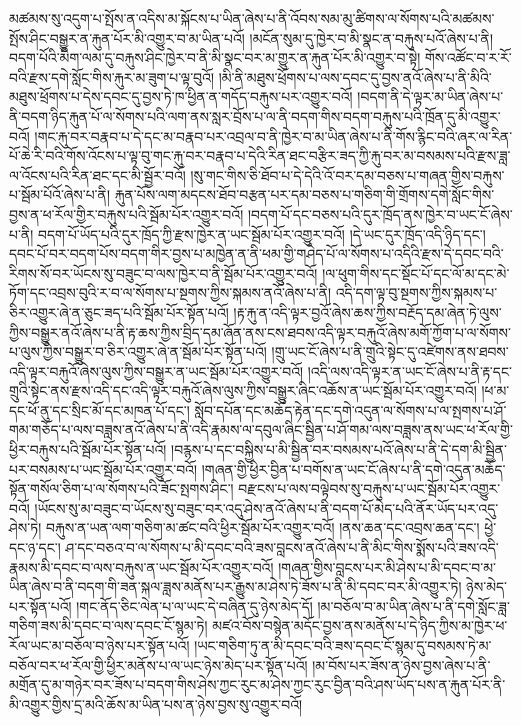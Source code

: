 མཚམས་སུ་འདུག་པ་སྤོས་ན་འདིས་མ་སྐོངས་པ་ཡིན་ཞེས་པ་ནི་འོབས་སམ་མུ་ཚིགས་ལ་སོགས་པའི་མཚམས་སྤོས་ཤིང་བསྒྱུར་ན་རྐུན་པོར་མི་འགྱུར་བ་མ་ཡིན་པའོ། །མངོན་སུམ་དུ་ཁྱེར་བ་མི་སྣང་ན་བརྐུས་པའོ་ཞེས་པ་ནི། བདག་པོའི་མིག་ལམ་དུ་བརྐུས་ཤིང་ཁྱེར་བ་ནི་མི་སྣང་བར་མ་གྱུར་ན་རྐུན་པོར་མི་འགྱུར་བ་སྟེ། གོས་འཚོང་བ་ར་རོ་བའི་རྫས་དགེ་སློང་གིས་རྐུར་མ་ཟུག་པ་ལྟ་བུའོ། །མི་ནི་མཐུས་ཕྲོགས་པ་ལས་དབང་དུ་བྱས་ནའོ་ཞེས་པ་ནི་མིའི་མཐུས་ཕྲོགས་པ་དེས་དབང་དུ་བྱས་ཏེ་ཁ་ཕྱིན་ན་གདོད་བརྐུས་པར་འགྱུར་བའོ། །བདག་ནི་དེ་ལྟར་མ་ཡིན་ཞེས་པ་ནི་བདག་ཉིད་རྐུན་པོ་ལ་སོགས་པའི་ལག་ནས་སླར་བྲོས་པ་ལ་ནི་བདག་གིས་བདག་བརྐུས་པའི་ཁྲོན་དུ་མི་འགྱུར་བའོ། །གང་རྐུ་བར་བརྣབ་པ་དེ་དང་མ་བརྣབ་པར་འབྲལ་བ་ནི་ཁྱེར་བ་མ་ཡིན་ཞེས་པ་ནི་གོས་རྙིང་བའི་ཞར་ལ་རིན་པོ་ཆེ་རི་བའི་གོས་འོངས་པ་ལྟ་བུ་གང་རྐུ་བར་བརྣབ་པ་དེའི་རིན་ཐང་བརྩིར་ཟད་ཀྱི་རྐུ་བར་མ་བསམས་པའི་རྫས་ཟླ་ལ་འོངས་པའི་རིན་ཐང་དང་མི་སྦྱོར་བའོ། །སུ་གང་གིས་ཅི་ཐོབ་པ་དེ་དེའི་འོ་བར་དམ་བཅས་པ་གཞན་གྱིས་བརྐུས་པ་སྦོམ་པོའོ་ཞེས་པ་ནི། རྐུན་པོས་ལག་མདངས་ཐོབ་བརྩན་པར་དམ་བཅས་པ་གཅིག་གི་གྲོགས་དགེ་སློང་གིས་བྱས་ན་ཕ་རོལ་གྱིར་བརྐུས་པའི་སྦོམ་པོར་འགྱུར་བའོ། །བདག་པོ་དང་བཅས་པའི་དུར་ཁྲོད་ནས་ཁྱེར་བ་ཡང་ངོ་ཞེས་པ་ནི། བདག་པོ་ཡོད་པའི་དུར་ཁྲོད་ཀྱི་རྫས་ཁྱེར་ན་ཡང་སྦོམ་པོར་འགྱུར་བའོ། །དེ་ཡང་དུར་ཁྲོད་འདི་ཉིད་དང་། དབང་པོ་བར་བདག་པོས་བདག་གིར་བྱས་པ་མཁྱེན་ན་ནི་ཕམ་གྱི་གཤེད་པོ་ལ་སོགས་པ་འདིའི་རྫས་དེ་དབང་བའི་རིགས་སོ་བར་ཡོངས་སུ་བཟུང་བ་ལས་ཁྱེར་བ་ནི་སྦོམ་པོར་འགྱུར་བའོ། །ལ་ཕུག་གིས་དང་སྡོང་པོ་དང་ལོ་མ་དང་མེ་ཏོག་དང་འབྲས་བུའི་ར་བ་ལ་སོགས་པ་སྔགས་ཀྱིས་སྐམས་ནའོ་ཞེས་པ་ནི། འདི་དག་ལྟ་བུ་སྔགས་ཀྱིས་སྐམས་པ་ཅིར་འགྱུར་ཞེ་ན་ཅུང་ཟད་པའི་སྦོམ་པོར་སྟོན་པའོ། །རྟ་རྐུ་ན་འདི་ལྟར་བྱའོ་ཞེས་ཆས་ཀྱིས་བརྔོད་དམ་ཞེན་ཏེ་ལུས་ཀྱིས་བསྒྱུར་ནའོ་ཞེས་པ་ནི་རྟ་ཆས་ཀྱིས་བྲིད་དམ་ཞོན་ནས་ངས་ཐབས་འདི་ལྟར་བརྐུའོ་ཞེས་མགོ་ཀྱོག་པ་ལ་སོགས་པ་ལུས་ཀྱིས་བསྒྱུར་བ་ཅིར་འགྱུར་ཞེ་ན་སྦོམ་པོར་སྟོན་པའོ། །གྲུ་ཡང་ངོ་ཞེས་པ་ནི་གྲུའི་སྟེང་དུ་འཛེགས་ནས་ཐབས་འདི་ལྟར་བརྐུའོ་ཞེས་ལུས་ཀྱིས་བསྒྱུར་ན་ཡང་སྦོམ་པོར་འགྱུར་བའོ། །འདི་ལས་འདི་ལྟར་ན་ཡང་ངོ་ཞེས་པ་ནི་རྟ་དང་གྲུའི་སྟེང་ནས་རྫས་འདི་དང་འདི་ལྟར་བརྐུའོ་ཞེས་ལུས་ཀྱིས་བསྒྱུར་ཞིང་འཆོས་ན་ཡང་སྦོམ་པོར་འགྱུར་བའོ། །ཕ་མ་དང་ཕོ་ནུ་དང་སྲིང་མོ་དང་མཁན་པོ་དང་། སློབ་དཔོན་དང་མཆོད་རྟེན་དང་དགེ་འདུན་ལ་སོགས་པ་ལ་སྤགས་པ་ཤོ་གམ་གཅོད་པ་ལས་བཟླས་ནའོ་ཞེས་པ་ནི་འདི་རྣམས་ལ་དབུལ་ཞིང་སྦྱིན་པ་ཤོ་གམ་ལས་བཟླས་ནས་ཡང་ཕ་རོལ་གྱི་ཕྱིར་བརྐུས་པའི་སྦོམ་པོར་སྟོན་པའོ། །བརྙས་པ་དང་བསྐྱིས་པ་མི་སྦྱིན་བར་བསམས་པའོ་ཞེས་པ་ནི་དེ་དག་མི་སྦྱིན་པར་བསམས་པ་ཡང་སྦོམ་པོར་འགྱུར་བའོ། །གཞན་གྱི་ཕྱིར་བྱིན་པ་བགོས་ན་ཡང་ངོ་ཞེས་པ་ནི་དགེ་འདུན་མཆོད་སྟོན་གསོལ་ཅིག་པ་ལ་སོགས་པའི་ཟོང་སྤགས་ཤིང་། བརྫངས་པ་ལས་བལྟེབས་སུ་བརྐུས་པ་ཡང་སྦོམ་པོར་འགྱུར་བའོ། །ཡོངས་སུ་མ་བཟུང་བ་ཡོངས་སུ་བཟུང་བར་འདུ་ཤེས་ནའོ་ཞེས་པ་ནི་བདག་པོ་མེད་པའི་ནོར་ཡོད་པར་འདུ་ཤེས་ཏེ། བརྐུས་ན་ཡན་ལག་གཅིག་མ་ཚང་བའི་ཕྱིར་སྦོམ་པོར་འགྱུར་བའོ། །ནས་ཆན་དང་འབྲས་ཆན་དང་། ཕྱེ་དང་ཉ་དང་། ཤ་དང་བཅའ་བ་ལ་སོགས་པ་མི་དབང་བའི་ཟས་བླངས་ནའོ་ཞེས་པ་ནི་མིང་གིས་སྨོས་པའི་ཟས་འདི་རྣམས་མི་དབང་བ་ལས་བརྐུས་ན་ཡང་སྦོམ་པོར་འགྱུར་བའོ། །གཞན་གྱིས་བླངས་པར་མི་ཤེས་པ་མི་དབང་བ་མ་ཡིན་ཞེས་བ་ནི་བདག་གི་ཟན་སྐལ་ཟླས་མནོས་པར་རྒྱུས་མ་ཤེས་ཏེ་ཟོས་པ་ནི་མི་དབང་བར་མི་འགྱུར་ཏེ། ཉེས་མེད་པར་སྟོན་པའོ། །གང་ནོད་ཅིང་ལེན་པ་ལ་ཡང་དེ་བཞིན་དུ་ཉེས་མེད་དོ། །མ་བཅོལ་བ་མ་ཡིན་ཞེས་པ་ནི་དགེ་སློང་ཟླ་གཅིག་ཟས་མི་དབང་བ་ལས་དབང་ངོ་སྙམ་ཏེ། མཛའ་བོས་བསྙེན་མདོང་བྱས་ནས་མནོས་པ་དེ་ཉིད་ཀྱིས་མ་ཁྱེར་ཕ་རོལ་ཡང་མ་བཅོལ་བ་ཉེས་པར་སྟོན་པའོ། །ཡང་གཅིག་ཏུ་ན་མི་དབང་བའི་ཟས་དབང་ངོ་སྙམ་དུ་བསམས་ཏེ་མ་བཅོལ་བར་ཕ་རོལ་གྱི་ཕྱིར་མནོས་པ་ལ་ཡང་ཉེས་མེད་པར་སྟོན་པའོ། །མ་བོས་པར་ཟོས་ན་ཉེས་བྱས་ཞེས་པ་ནི་མགྲོན་དུ་མ་གཉེར་བར་ཟོས་པ་བདག་གིས་ཤེས་ཀྱང་རུང་མ་ཤེས་ཀྱང་རུང་བྱིན་བའི་ཤས་ཡོད་པས་ན་རྐུན་པོར་ནི་མི་འགྱུར་གྱིས་དྲ་མའི་ཆོས་མ་ཡིན་པས་ན་ཉེས་བྱས་སུ་འགྱུར་བའོ། 